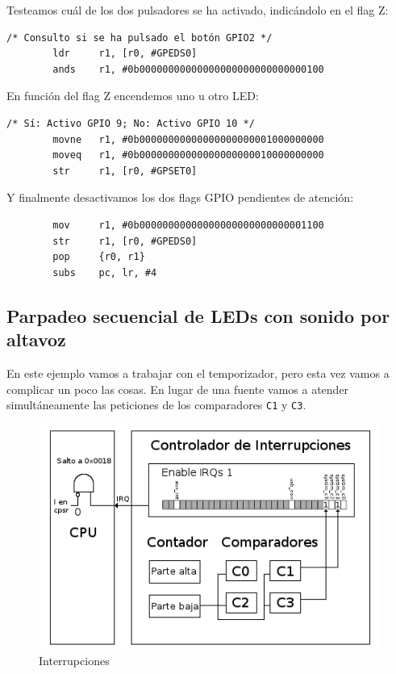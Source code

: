 Testeamos cuál de los dos pulsadores se ha activado, indicándolo en el flag Z:

\begin{lstlisting}
/* Consulto si se ha pulsado el botón GPIO2 */
        ldr     r1, [r0, #GPEDS0]
        ands    r1, #0b00000000000000000000000000000100
\end{lstlisting}

En función del flag Z encendemos uno u otro LED:

\begin{lstlisting}
/* Sí: Activo GPIO 9; No: Activo GPIO 10 */
        movne   r1, #0b00000000000000000000001000000000
        moveq   r1, #0b00000000000000000000010000000000
        str     r1, [r0, #GPSET0]
\end{lstlisting}

Y finalmente desactivamos los dos flags GPIO pendientes de atención:

\begin{lstlisting}
        mov     r1, #0b00000000000000000000000000001100
        str     r1, [r0, #GPEDS0]
        pop     {r0, r1}
        subs    pc, lr, #4
\end{lstlisting}

\newpage
\subsection{Parpadeo secuencial de LEDs con sonido por altavoz}

En este ejemplo vamos a trabajar con el temporizador, pero esta vez vamos a complicar
un poco las cosas. En lugar de una fuente vamos a atender simultáneamente las peticiones
de los comparadores {\tt C1} y {\tt C3}.

\begin{figure}[h]
  \centering
    \includegraphics[width=12cm]{graphs/inter4.png}
  \caption{Interrupciones}
  \label{fig:inter4}
\end{figure}

